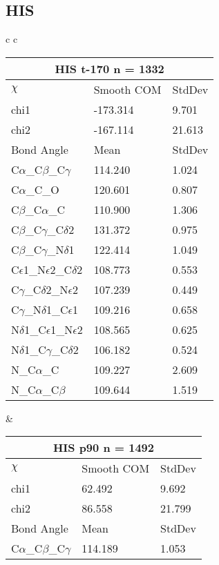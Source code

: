 \newpage
\subsection{HIS}

\begin{longtable}{ c c }

  \begin{tabular}{ l l l }
  \toprule
  \multicolumn{3}{c}{HIS \textbf{t-170} n = 1332} \\ \toprule
  $\chi$       & Smooth COM & StdDev \\ \midrule
  chi1 & -173.314 & 9.701 \\ 
  chi2 & -167.114 & 21.613 \\ \midrule
  Bond Angle   & Mean     & StdDev \\ \midrule
  C$\alpha$\_C$\beta$\_C$\gamma$ & 114.240 & 1.024\\
  C$\alpha$\_C\_O & 120.601 & 0.807\\
  C$\beta$\_C$\alpha$\_C & 110.900 & 1.306\\
  C$\beta$\_C$\gamma$\_C$\delta$2 & 131.372 & 0.975\\
  C$\beta$\_C$\gamma$\_N$\delta$1 & 122.414 & 1.049\\
  C$\epsilon$1\_N$\epsilon$2\_C$\delta$2 & 108.773 & 0.553\\
  C$\gamma$\_C$\delta$2\_N$\epsilon$2 & 107.239 & 0.449\\
  C$\gamma$\_N$\delta$1\_C$\epsilon$1 & 109.216 & 0.658\\
  N$\delta$1\_C$\epsilon$1\_N$\epsilon$2 & 108.565 & 0.625\\
  N$\delta$1\_C$\gamma$\_C$\delta$2 & 106.182 & 0.524\\
  N\_C$\alpha$\_C & 109.227 & 2.609\\
  N\_C$\alpha$\_C$\beta$ & 109.644 & 1.519\\
  \bottomrule
  \end{tabular}
  &
  \begin{tabular}{ l l l }
  \toprule
  \multicolumn{3}{c}{HIS \textbf{p90} n = 1492} \\ \toprule
  $\chi$       & Smooth COM & StdDev \\ \midrule
  chi1 & 62.492 & 9.692 \\ 
  chi2 & 86.558 & 21.799 \\ \midrule
  Bond Angle   & Mean     & StdDev \\ \midrule
  C$\alpha$\_C$\beta$\_C$\gamma$ & 114.189 & 1.053\\

\end{tabular}
\end{longtable}
